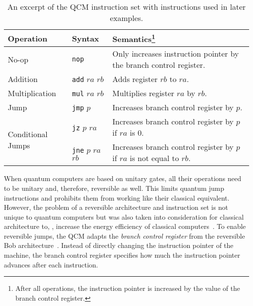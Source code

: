 \begin{table}[htp]
    \centering
    \begin{tabular}{llp{}}
        \multicolumn{1}{l|}{Operation}                          & \multicolumn{1}{l|}{Syntax}                                      & Semantics\footnote{After all operations, the instruction pointer is increased by the value of the branch control register.}                                                              \\ \hline
        
        \multicolumn{1}{l|}{No-op}                              & \multicolumn{1}{l|}{\texttt{nop}}               & Only increases instruction pointer by the branch control register.     \\ \hline
        
        \multicolumn{1}{l|}{Addition}                           & \multicolumn{1}{l|}{\texttt{add} $ra$ $rb$}     & Adds register $rb$ to $ra$.                                            \\
        \multicolumn{1}{l|}{Multiplication}                     & \multicolumn{1}{l|}{\texttt{mul} $ra$ $rb$}     & Multiplies register $ra$ by $rb$.                                      \\ \hline
        
        \multicolumn{1}{l|}{Jump}                               & \multicolumn{1}{l|}{\texttt{jmp} $p$}           & Increases branch control register by $p$.                              \\
        \multicolumn{1}{l|}{\multirow{2}{*}{Conditional Jumps}} & \multicolumn{1}{l|}{\texttt{jz} $p$ $ra$}       & Increases branch control register by $p$ if $ra$ is $0$.               \\
        \multicolumn{1}{l|}{}                                   & \multicolumn{1}{l|}{\texttt{jne} $p$ $ra$ $rb$} & Increases branch control register by $p$ if $ra$ is not equal to $rb$. 
    \end{tabular}
    \caption{An excerpt of the QCM instruction set with instructions used in later examples.}
    \label{tab:qcm_instructionset}
\end{table}

When quantum computers are based on unitary gates, all their operations need to be unitary and, therefore, reversible as well. This limits quantum jump instructions and prohibits them from working like their classical equivalent. However, the problem of a reversible architecture and instruction set is not unique to quantum computers but was also taken into consideration for classical architecture to, \eg, increase the energy efficiency of classical computers~\cite{AGY07, TAG12}. 
To enable reversible jumps, the QCM adapts the \emph{branch control register} from the reversible Bob architecture~\cite{TAG12}. Instead of directly changing the instruction pointer of the machine, the branch control register specifies how much the instruction pointer advances after each instruction.

